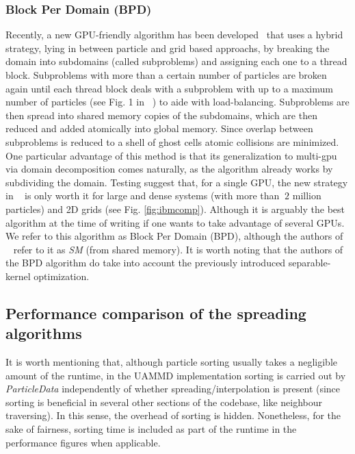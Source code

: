 \documentclass[ twoside,openright,titlepage,numbers=noenddot,%
headinclude,footinclude,cleardoublepage=empty,abstract=on,
BCOR=5mm,paper=b5,fontsize=11pt, dvipsnames
]{scrreprt}
\newcommand{\uammd}{\gls{UAMMD}\xspace}
\newcommand{\gpu}{\gls{GPU}\xspace}
\begin{document}
\subsubsection*{Block Per Domain (BPD)}
Recently, a new \gpu-friendly algorithm has been developed~\cite{Shih2021} that uses a hybrid strategy, lying in between particle and grid based approachs, by breaking the domain into subdomains (called subproblems) and assigning each one to a thread block. Subproblems with more than a certain number of particles are broken again until each thread block deals with a subproblem with up to a maximum number of particles (see Fig. 1 in ~\cite{Shih2021}) to aide with load-balancing. Subproblems are then spread into shared memory copies of the subdomains, which are then reduced and added atomically into global memory. Since overlap between subproblems is reduced to a shell of ghost cells atomic collisions are minimized. One particular advantage of this method is that its generalization to multi-gpu via domain decomposition comes naturally, as the algorithm already works by subdividing the domain. Testing suggest that, for a single \gpu, the new strategy in ~\cite{Shih2021} is only worth it for large and dense systems (with more than $~2$ million particles) and 2D grids (see Fig. \ref{fig:ibmcomp}). Although it is arguably the best algorithm at the time of writing if one wants to take advantage of several GPUs.
We refer to this algorithm as Block Per Domain (BPD), although the authors of ~\cite{Shih2021} refer to it as \emph{SM} (from shared memory). It is worth noting that the authors of the BPD algorithm do take into account the previously introduced separable-kernel optimization.

\subsection*{Performance comparison of the spreading algorithms}
It is worth mentioning that, although particle sorting usually takes a negligible amount of the runtime, in the \uammd implementation sorting is carried out by \emph{ParticleData} independently of whether spreading/interpolation is present (since sorting is beneficial in several other sections of the codebase, like neighbour traversing). In this sense, the overhead of sorting is hidden. Nonetheless, for the sake of fairness, sorting time is included as part of the runtime in the performance figures when applicable.
\end{document}
